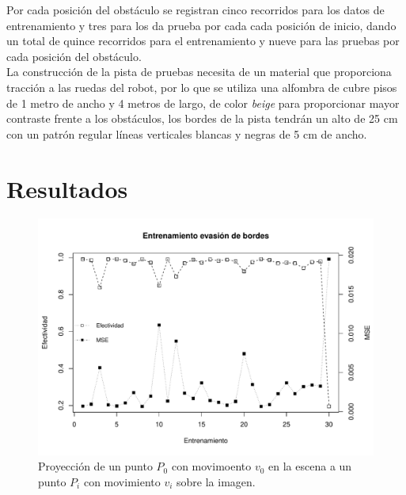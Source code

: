 \documentclass{iccmemoria}
\begin{document}
Por cada posición del obstáculo se registran cinco recorridos para los datos de entrenamiento y tres para los da prueba por cada cada posición de inicio, dando un total de quince recorridos para el entrenamiento y nueve para las pruebas por cada posición del obstáculo.\\
 
La construcción de la pista de pruebas necesita de un material que proporciona tracción a las ruedas del robot, por lo que se utiliza una alfombra de cubre pisos de 1 metro de ancho y 4 metros de largo, de color \emph{beige} para proporcionar mayor contraste frente a los obstáculos, los bordes de la pista tendrán un alto de 25 cm con un patrón regular líneas verticales blancas y negras de 5 cm de ancho.

\chapter{Resultados}

\begin{figure}[H]
  \centering
  \includegraphics[width = 450pt]{images/plot.pdf}
  \caption[Proyección de un punto sobre la imagen.]{Proyección de un punto $P_0$ con movimoento $v_0$ en la escena  a un punto $P_i$ con movimiento $v_i$ sobre la imagen.}
  \label{fig:proyeccion_flujo_optico}
\end{figure}
\end{document}
